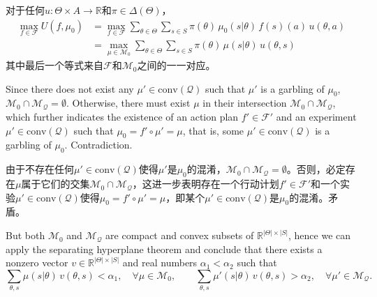 \documentclass[12pt,a4paper]{article}
\newenvironment{original}
  {\par\vspace{4pt}\noindent\color{black}\ignorespaces}
  {\par\vspace{2pt}}
\newenvironment{translation}
  {\par\vspace{2pt}\noindent\color{myblue}\ignorespaces}
  {\par\vspace{6pt}}
\newcommand{\R}{\mathbb{R}}
\newcommand{\Delt}{\Delta}
\newcommand{\calF}{\mathcal{F}}
\newcommand{\conv}{\mathrm{conv}}
\begin{document}
\begin{translation}
对于任何$u:\Theta\times A\to\R$和$\pi\in\Delt(\Theta)$，
\begin{align}
    \max_{f\in\calF} U(f, \mu_0) &= \max_{f\in\calF} \sum_{\theta\in\Theta}\sum_{s\in S} \pi(\theta)\,\mu_0(s|\theta)\,f(s)(a)\,u(\theta,a) \nonumber\\
                                 &= \max_{\mu\in\mathcal{M}_0} \sum_{\theta\in\Theta}\sum_{s\in S} \pi(\theta)\,\mu(s|\theta)\,u(\theta,s)
\end{align}
其中最后一个等式来自$\calF$和$\mathcal{M}_0$之间的一一对应。
\end{translation}

\begin{original}
Since there does not exist any $\mu'\in\conv(\mathcal{Q})$ such that $\mu'$ is a garbling of $\mu_0$, $\mathcal{M}_0\cap\mathcal{M}_{\mathcal{Q}}=\emptyset$. Otherwise, there must exist $\mu$ in their intersection $\mathcal{M}_0\cap\mathcal{M}_{\mathcal{Q}}$, which further indicates the existence of an action plan $f'\in\calF'$ and an experiment $\mu'\in\conv(\mathcal{Q})$ such that $\mu_0=f'\circ\mu'=\mu$, that is, some $\mu'\in\conv(\mathcal{Q})$ is a garbling of $\mu_0$. Contradiction.
\end{original}

\begin{translation}
由于不存在任何$\mu'\in\conv(\mathcal{Q})$使得$\mu'$是$\mu_0$的混淆，$\mathcal{M}_0\cap\mathcal{M}_{\mathcal{Q}}=\emptyset$。否则，必定存在$\mu$属于它们的交集$\mathcal{M}_0\cap\mathcal{M}_{\mathcal{Q}}$，这进一步表明存在一个行动计划$f'\in\calF'$和一个实验$\mu'\in\conv(\mathcal{Q})$使得$\mu_0=f'\circ\mu'=\mu$，即某个$\mu'\in\conv(\mathcal{Q})$是$\mu_0$的混淆。矛盾。
\end{translation}

\begin{original}
But both $\mathcal{M}_0$ and $\mathcal{M}_{\mathcal{Q}}$ are compact and convex subsets of $\R^{|\Theta|\times|S|}$, hence we can apply the separating hyperplane theorem and conclude that there exists a nonzero vector $v\in\R^{|\Theta|\times|S|}$ and real numbers $\alpha_1<\alpha_2$ such that
\begin{equation}
    \sum_{\theta,s} \mu(s|\theta)\,v(\theta,s) < \alpha_1, \quad \forall\mu\in\mathcal{M}_0, \qquad
    \sum_{\theta,s} \mu'(s|\theta)\,v(\theta,s) > \alpha_2, \quad \forall\mu'\in\mathcal{M}_{\mathcal{Q}}.
\end{equation}
\end{original}
\end{document}
